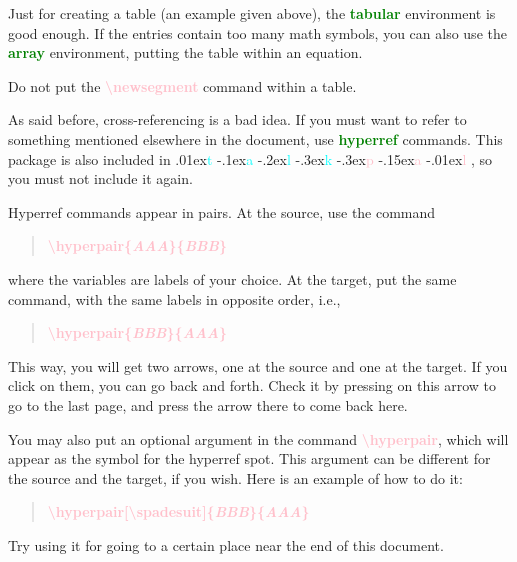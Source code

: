 \documentclass[12pt]{article}
\def\talkpal{
\raise.01ex\hbox{\textcolor{cyan}{t}}%
\raise-.1ex\hbox{\textcolor{cyan}{a}}%
\raise-.2ex\hbox{\textcolor{cyan}{l}}%
\raise-.3ex\hbox{\textcolor{cyan}{k}}%
\raise-.3ex\hbox{\textcolor{pink}{p}}%
\raise-.15ex\hbox{\textcolor{pink}{a}}%
\raise-.01ex\hbox{\textcolor{pink}{l}}%
}
\def\commcolor{pink}
\def\noncomm#1{{\textcolor{green}{\bf #1}}}
\def\comm#1{\textcolor{\commcolor}{\bf \textbackslash#1}}
\def\var#1{\textcolor{lightmagenta}{\bf{\em #1}}}
\def\section#1{
\fcolorbox{leaf}{red}{
  \textcolor{white}{\Huge #1\vphantom{y}}}}
\newenvironment{Quote}{\vspace{-5mm}\begin{quote}}{\end{quote}\vspace{-5mm}}
\begin{document}
Just for creating a table (an example given above), the
\noncomm{tabular} environment is good enough.  If the entries contain
too many math symbols, you can also use the \noncomm{array} environment,
putting the table within an equation.

\newsegment

Do not put the \comm{newsegment} command within a table.

\endslide

\beginslide

\section{Using \noncomm{hyperref}}

As said before, cross-referencing is a bad idea.  If you must want to
refer to something mentioned elsewhere in the document, use 
\noncomm{hyperref} commands.  This package is also included in \talkpal,
so you must not include it again.

\newsegment

Hyperref commands appear in pairs.  At the source, use the command
\begin{Quote}
  \comm{hyperpair\{\var{AAA}\}\{\var{BBB}\}}
\end{Quote}
where the variables are labels of your choice.  At the target, put the
same command, with the same labels in opposite order, i.e., 
\begin{Quote}
  \comm{hyperpair\{\var{BBB}\}\{\var{AAA}\}}
\end{Quote}
This way, you will get two arrows, one at the source and one at the
target.  If you click on them, you can go back and forth.
\newsegment
Check it by pressing on this arrow
to go to the last page, and press the arrow there to come back here.

\endslide

\beginslide

You may also put an optional argument in the command \comm{hyperpair},
which will appear as the symbol for the hyperref spot.  This argument
can be different for the source and the target, if you wish.  Here is an
example of how to do it:
\begin{Quote}
  \comm{hyperpair[\comm{spadesuit}]\{\var{BBB}\}\{\var{AAA}\}}
\end{Quote}

Try using it for going to a certain place near the end of this
document.
\end{document}
